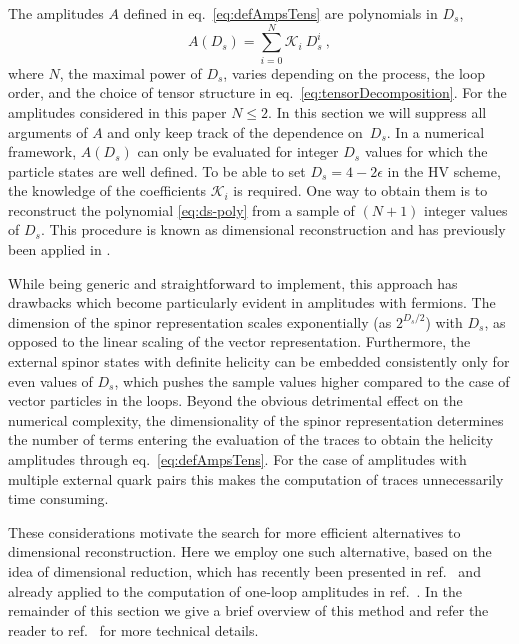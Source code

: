 The amplitudes $A$ defined in eq.~\eqref{eq:defAmpsTens} are polynomials in $D_s$,
\begin{equation}
  A(D_s) = \sum_{i=0}^{N} \mathcal{K}_i~D_s^{i}\ ,
  \label{eq:ds-poly}
\end{equation}
where $N$, the maximal power of $D_s$, 
varies depending on the process, the loop order, and the choice of tensor structure 
in eq.~\eqref{eq:tensorDecomposition}.
For the amplitudes considered in this paper $N\leq2$.
In this section we will suppress all arguments of $A$ and only keep track of the 
dependence on~$D_s$.
%
In a numerical framework, $A(D_s)$ can only be evaluated for integer $D_s$ values for which 
the particle states are well defined.
To be able to set $D_s=4-2\epsilon$ in the HV scheme, the knowledge of the coefficients $\mathcal{K}_i$ is required.
One way to obtain them is to reconstruct the polynomial \eqref{eq:ds-poly} from
a sample of $(N+1)$ integer values of $D_s$.
This procedure is known as dimensional reconstruction \cite{Giele:2008ve} and has  previously been applied
in \cite{Ellis:2008ir,Boughezal:2011br,Abreu:2017xsl,Abreu:2017hqn}.

While being generic and straightforward to implement, this approach has drawbacks which
become particularly evident in amplitudes with fermions.
%
The dimension of the spinor representation scales exponentially (as $2^{D_s/2}$) with $D_s$,
as opposed to the linear scaling of the vector representation.
Furthermore, the external spinor states with definite helicity can be embedded consistently
only for even values of $D_s$,
which pushes the sample values higher compared to the case of vector particles in the loops.
Beyond the obvious detrimental effect on the numerical complexity, the dimensionality of the
spinor representation determines the number of terms entering the evaluation of the traces
to obtain the helicity amplitudes through  eq.~\eqref{eq:defAmpsTens}. For
the case of amplitudes with multiple external quark pairs this makes the computation
of traces unnecessarily time consuming.

These considerations motivate the search for more efficient alternatives to dimensional
reconstruction. Here we employ one such alternative, based on the idea of
dimensional reduction, which has recently been presented in ref.~\cite{Anger:2018ove} 
and already applied to the computation of one-loop amplitudes in ref.~\cite{Anger:2017glm}.
In the remainder of this section we give a brief overview of this method 
and refer the reader to ref.~\cite{Anger:2018ove} for more technical details.

